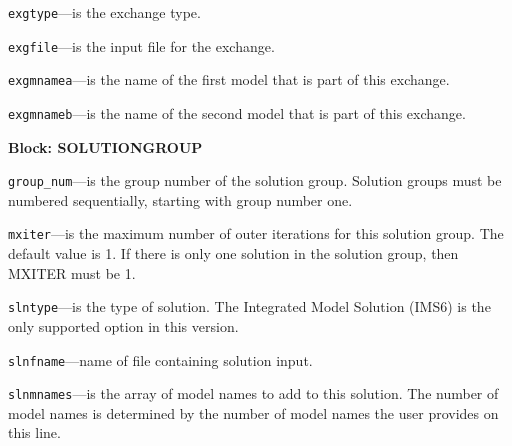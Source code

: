 \begin{description}
\item \texttt{exgtype}---is the exchange type.

\item \texttt{exgfile}---is the input file for the exchange.

\item \texttt{exgmnamea}---is the name of the first model that is part of this exchange.

\item \texttt{exgmnameb}---is the name of the second model that is part of this exchange.

\end{description}
\item \textbf{Block: SOLUTIONGROUP}

\begin{description}
\item \texttt{group\_num}---is the group number of the solution group.  Solution groups must be numbered sequentially, starting with group number one.

\item \texttt{mxiter}---is the maximum number of outer iterations for this solution group.  The default value is 1.  If there is only one solution in the solution group, then MXITER must be 1.

\item \texttt{slntype}---is the type of solution.  The Integrated Model Solution (IMS6) is the only supported option in this version.

\item \texttt{slnfname}---name of file containing solution input.

\item \texttt{slnmnames}---is the array of model names to add to this solution.  The number of model names is determined by the number of model names the user provides on this line.

\end{description}

